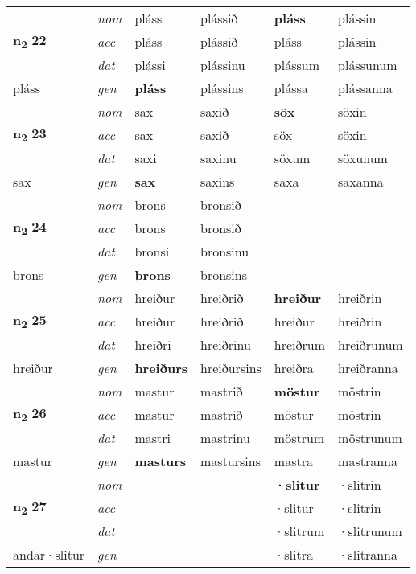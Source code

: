 \begin{longtable}[l]{X>{\footnotesize\itshape}XXXXX}
\multirow{3}{*}{{{\textbf{n{\textsubscript{2}}} \Large{\textbf{22}}}}} & nom & pláss & plássið & \textbf{pláss} & plássin \\*
 & acc & pláss & plássið & pláss & plássin \\*
 & dat & plássi & plássinu & plássum & plássunum \\*
 {\footnotesize{pláss}} & gen & \textbf{pláss} & plássins & plássa & plássanna \\
\cmidrule{1-6}

\multirow{3}{*}{{{\textbf{n{\textsubscript{2}}} \Large{\textbf{23}}}}} & nom & sax & saxið & \textbf{söx} & söxin \\*
 & acc & sax & saxið & söx & söxin \\*
 & dat & saxi & saxinu & söxum & söxunum \\*
 {\footnotesize{sax}} & gen & \textbf{sax} & saxins & saxa & saxanna \\
\cmidrule{1-6}

\multirow{3}{*}{{{\textbf{n{\textsubscript{2}}} \Large{\textbf{24}}}}} & nom & brons & bronsið & \textbf{} &  \\*
 & acc & brons & bronsið &  &  \\*
 & dat & bronsi & bronsinu &  &  \\*
 {\footnotesize{brons}} & gen & \textbf{brons} & bronsins &  &  \\
\cmidrule{1-6}

\multirow{3}{*}{{{\textbf{n{\textsubscript{2}}} \Large{\textbf{25}}}}} & nom & hreiður & hreiðrið & \textbf{hreiður} & hreiðrin \\*
 & acc & hreiður & hreiðrið & hreiður & hreiðrin \\*
 & dat & hreiðri & hreiðrinu & hreiðrum & hreiðrunum \\*
 {\footnotesize{hreiður}} & gen & \textbf{hreiðurs} & hreiðursins & hreiðra & hreiðranna \\
\cmidrule{1-6}

\multirow{3}{*}{{{\textbf{n{\textsubscript{2}}} \Large{\textbf{26}}}}} & nom & mastur & mastrið & \textbf{möstur} & möstrin \\*
 & acc & mastur & mastrið & möstur & möstrin \\*
 & dat & mastri & mastrinu & möstrum & möstrunum \\*
 {\footnotesize{mastur}} & gen & \textbf{masturs} & mastursins & mastra & mastranna \\
\cmidrule{1-6}

\multirow{3}{*}{{{\textbf{n{\textsubscript{2}}} \Large{\textbf{27}}}}} & nom &  &  & \textbf{·slitur} & ·slitrin \\*
 & acc &  &  & ·slitur & ·slitrin \\*
 & dat &  &  & ·slitrum & ·slitrunum \\*
 {\footnotesize{andar\allowbreak ·slitur}} & gen & \textbf{} &  & ·slitra & ·slitranna \\
\cmidrule{1-6}


\end{longtable}
